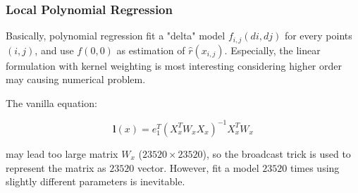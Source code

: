 \documentclass{beamer}
\begin{document}
\begin{frame}
  \frametitle{Local Polynomial Regression}

  Basically, polynomial regression fit a "delta" model $f_{i,j}(di,dj)$ for every points $(i,j)$, and use $f(0,0)$
  as estimation of $\hat{r}(x_{i,j})$. Especially, the linear formulation with kernel weighting is most 
  interesting considering higher order may causing numerical problem.
  
  The vanilla equation:
  
  $$
  \mathbf{l}(x) = e_1^T (X_x^T W_x X_x)^{-1} X_x^T W_x
  $$
  
  may lead too large matrix $W_x$ ($23520 \times 23520$), so the broadcast trick is used to represent the matrix as 
  $23520$ vector. However, fit a model $23520$ times using slightly different parameters is inevitable. 
  
\end{frame}
\end{document}
